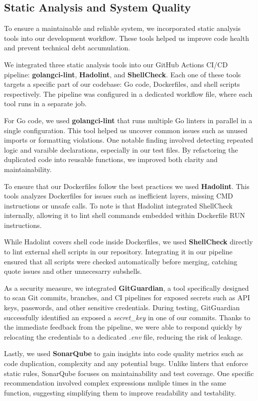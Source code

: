 \subsection{Static Analysis and System Quality}
To ensure a maintainable and reliable system, we incorporated static analysis tools into our development workflow. These tools helped us improve code health and prevent technical debt accumulation.

We integrated three static analysis tools into our GitHub Actions CI/CD pipeline: \textbf{golangci-lint}, \textbf{Hadolint}, and \textbf{ShellCheck}. Each one of these tools targets a specific part of our codebase: Go code, Dockerfiles, and shell scripts respectively. The pipeline was configured in a dedicated workflow file, where each tool runs in a separate job.


For Go code, we used \textbf{golangci-lint} that runs multiple Go linters in parallel in a single configuration. This tool helped us uncover common issues such as unused imports or formatting violations. One notable finding involved detecting repeated logic and varaible declarations, especially in our test files. By refactoring the duplicated code into reusable functions, we improved both clarity and maintainability.

To ensure that our Dockerfiles follow the best practices we used \textbf{Hadolint}. This tools analyzes Dockerfiles for issues such as inefficient layers, missing CMD instructions or unsafe calls. To note is that Hadolint integrated ShellCheck internally, allowing it to lint shell commands embedded within Dockerfile RUN instructions.


While Hadolint covers shell code inside Dockerfiles, we used \textbf{ShellCheck} directly to lint external shell scripts in our repository. Integrating it in our pipeline ensured that all scripts were checked automatically before merging, catching quote issues and other unnecesarry subshells.

As a security measure, we integrated \textbf{GitGuardian}, a tool specifically designed to scan Git commits, branches, and CI pipelines for exposed secrets such as API keys, passwords, and other sensitive credentials. During testing, GitGuardian successfully identified an exposed a \textit{secret\_key} in one of our commits. Thanks to the immediate feedback from the pipeline, we were able to respond quickly by relocating the credentials to a dedicated \textit{.env} file, reducing the risk of leakage.

Lastly, we used \textbf{SonarQube} to gain insights into code quality metrics such as code duplication, complexity and any potential bugs. Unlike linters that enforce static rules, SonarQube focuses on maintainability and test coverage. One specific recommendation involved complex expressions muliple times in the same function, suggesting simplifying them to improve readability and testability.



